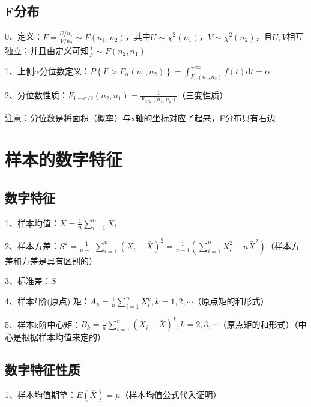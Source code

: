 \subsection{F分布}

0、定义：$F=\frac{U / n_{1}}{V / n_{2}} \sim F\left(n_{1}, n_{2}\right)$，其中$U \sim \chi^{2}\left(n_{1}\right)$，$ V \sim \chi^{2}\left(n_{2}\right)$，且$U,V$相互独立；并且由定义可知$\frac{1}{F} \sim F\left(n_{2}, n_{1}\right)$

1、上侧$\alpha$分位数定义：$P\left\{F>F_{\alpha}\left(n_{1}, n_{2}\right)\right\}=\int_{F_{\alpha}\left(n_{1}, n_{2}\right)}^{+\infty} f(t) \mathrm{d} t=\alpha$

2、分位数性质：$F_{1-\alpha/2}(n_{2},n_{1})=\frac{1}{F_{{\alpha}/{2}}\left(n_{1}, n_{2}\right)}$（三变性质）

注意：分位数是将面积（概率）与x轴的坐标对应了起来，F分布只有右边

\section{样本的数字特征}



\subsection{数字特征}

1、样本均值：$\bar{X}=\frac{1}{n} \sum_{i=1}^{n} X_{i}$

2、样本方差：$S^{2}=\frac{1}{n-1} \sum_{i=1}^{n}\left(X_{i}-\bar{X}\right)^{2}=\frac{1}{n-1}\left(\sum_{i=1}^{n} X_{i}^{2}-n \bar{X}^{2}\right)$（样本方差和方差是具有区别的）

3、标准差：$S$

4、样本$k$阶(原点) 矩：$A_{k}=\frac{1}{n} \sum_{i=1}^{n} X_{i}^{k}, k=1,2, \cdots$（原点矩的和形式）

5、样本k阶中心矩：$B_{k}=\frac{1}{n} \sum_{i=1}^{n}\left(X_{i}-\bar{X}\right)^{k}, k=2,3, \cdots$（原点矩的和形式）（中心是根据样本均值来定的）



\subsection{数字特征性质}

1、样本均值期望：$E(\bar{X}) = \mu$（样本均值公式代入证明）

